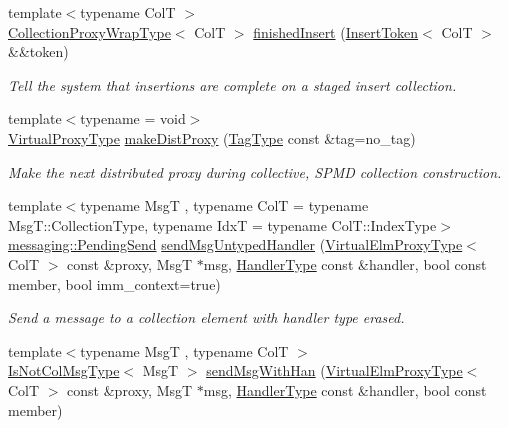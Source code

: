 \begin{DoxyCompactItemize}
{\footnotesize template$<$typename ColT $>$ }\\\hyperlink{structvt_1_1vrt_1_1collection_1_1_collection_manager_a56458ed7f9bb22b631b9b3a745f42f94}{Collection\+Proxy\+Wrap\+Type}$<$ ColT $>$ \hyperlink{structvt_1_1vrt_1_1collection_1_1_collection_manager_a9275a4f6a7c33389813ba7fe4cc75d7e}{finished\+Insert} (\hyperlink{structvt_1_1vrt_1_1collection_1_1_insert_token}{Insert\+Token}$<$ ColT $>$ \&\&token)
\begin{DoxyCompactList}\small\item\em Tell the system that insertions are complete on a staged insert collection. \end{DoxyCompactList}\item 
{\footnotesize template$<$typename  = void$>$ }\\\hyperlink{namespacevt_a1b417dd5d684f045bb58a0ede70045ac}{Virtual\+Proxy\+Type} \hyperlink{structvt_1_1vrt_1_1collection_1_1_collection_manager_a1f18abc7b511cce4d07ba011c91d21df}{make\+Dist\+Proxy} (\hyperlink{namespacevt_a84ab281dae04a52a4b243d6bf62d0e52}{Tag\+Type} const \&tag=no\+\_\+tag)
\begin{DoxyCompactList}\small\item\em Make the next distributed proxy during collective, S\+P\+MD collection construction. \end{DoxyCompactList}\item 
{\footnotesize template$<$typename MsgT , typename ColT  = typename Msg\+T\+::\+Collection\+Type, typename IdxT  = typename Col\+T\+::\+Index\+Type$>$ }\\\hyperlink{structvt_1_1messaging_1_1_pending_send}{messaging\+::\+Pending\+Send} \hyperlink{structvt_1_1vrt_1_1collection_1_1_collection_manager_a26df5d55e8992f2d2a2752f61cc26d23}{send\+Msg\+Untyped\+Handler} (\hyperlink{namespacevt_1_1vrt_a620a5c8c59d13e513f690c74b4af516f}{Virtual\+Elm\+Proxy\+Type}$<$ ColT $>$ const \&proxy, MsgT $\ast$msg, \hyperlink{namespacevt_af64846b57dfcaf104da3ef6967917573}{Handler\+Type} const \&handler, bool const member, bool imm\+\_\+context=true)
\begin{DoxyCompactList}\small\item\em Send a message to a collection element with handler type erased. \end{DoxyCompactList}\item 
{\footnotesize template$<$typename MsgT , typename ColT $>$ }\\\hyperlink{structvt_1_1vrt_1_1collection_1_1_collection_manager_ae376deeefd4f89a0b1c93849977715d9}{Is\+Not\+Col\+Msg\+Type}$<$ MsgT $>$ \hyperlink{structvt_1_1vrt_1_1collection_1_1_collection_manager_a416015d4b3a1bfe6dd7088b48e1f48f5}{send\+Msg\+With\+Han} (\hyperlink{namespacevt_1_1vrt_a620a5c8c59d13e513f690c74b4af516f}{Virtual\+Elm\+Proxy\+Type}$<$ ColT $>$ const \&proxy, MsgT $\ast$msg, \hyperlink{namespacevt_af64846b57dfcaf104da3ef6967917573}{Handler\+Type} const \&handler, bool const member)

\end{DoxyCompactItemize}
